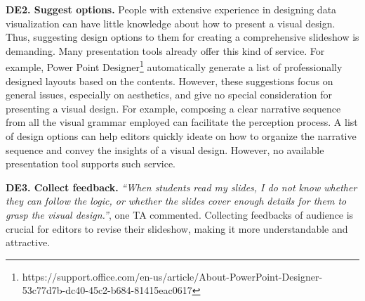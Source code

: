 \noindent
\textbf{DE2. Suggest options.}
People with extensive experience in designing data visualization can have little knowledge about how to present a visual design. 
Thus, suggesting design options to them for creating a comprehensive slideshow is demanding. Many presentation tools already offer this kind of service. For example, Power Point Designer\footnote{https://support.office.com/en-us/article/About-PowerPoint-Designer-53c77d7b-dc40-45c2-b684-81415eac0617} automatically generate a list of professionally designed layouts based on the contents. However, these suggestions focus on general issues, especially on aesthetics, and give no special consideration for presenting a visual design.
For example, composing a clear narrative sequence from all the visual grammar employed can facilitate the perception process. A list of design options can help editors quickly ideate on how to organize the narrative sequence and convey the insights of a visual design. However, no available presentation tool supports such service. 

\noindent
\textbf{DE3. Collect feedback.} \textit{``When students read my slides, I do not know whether they can follow the logic, or whether the slides cover enough details for them to grasp the visual design.''}, one TA commented. 
Collecting feedbacks of audience is crucial for editors to revise their slideshow, making it more understandable and attractive.  

